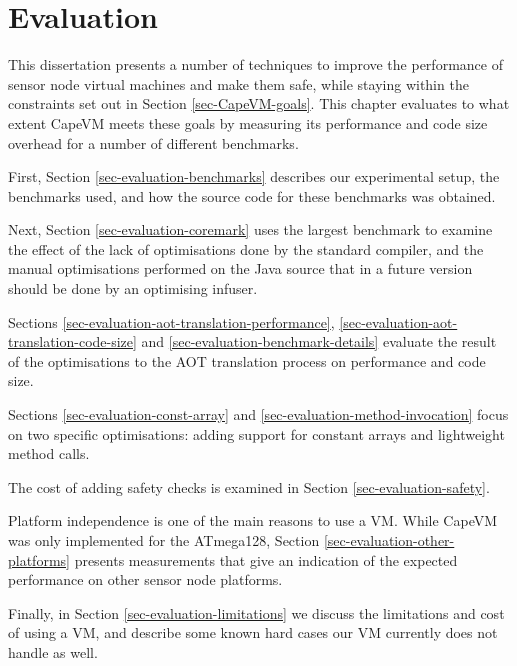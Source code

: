 \chapter{Evaluation}
\label{sec-evaluation}
This dissertation presents a number of techniques to improve the performance of sensor node virtual machines and make them safe, while staying within the constraints set out in Section \ref{sec-CapeVM-goals}. This chapter evaluates to what extent CapeVM meets these goals by measuring its performance and code size overhead for a number of different benchmarks.

First, Section \ref{sec-evaluation-benchmarks} describes our experimental setup, the benchmarks used, and how the source code for these benchmarks was obtained.

Next, Section \ref{sec-evaluation-coremark} uses the largest benchmark to examine the effect of the lack of optimisations done by the standard  compiler, and the manual optimisations performed on the Java source that in a future version should be done by an optimising infuser.

Sections \ref{sec-evaluation-aot-translation-performance}, \ref{sec-evaluation-aot-translation-code-size} and \ref{sec-evaluation-benchmark-details} evaluate the result of the optimisations to the AOT translation process on performance and code size.

Sections \ref{sec-evaluation-const-array} and \ref{sec-evaluation-method-invocation} focus on two specific optimisations: adding support for constant arrays and lightweight method calls.

The cost of adding safety checks is examined in Section \ref{sec-evaluation-safety}.

Platform independence is one of the main reasons to use a VM. While CapeVM was only implemented for the ATmega128, Section \ref{sec-evaluation-other-platforms} presents measurements that give an indication of the expected performance on other sensor node platforms.

Finally, in Section \ref{sec-evaluation-limitations} we discuss the limitations and cost of using a VM, and describe some known hard cases our VM currently does not handle as well.
